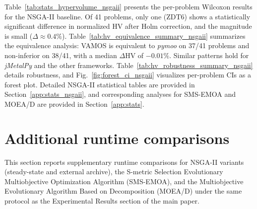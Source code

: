 \documentclass[journal]{IEEEtran}
\newcommand{\VAMOS}{VAMOS}
\begin{document}
Table~\ref{tab:stats_hypervolume_nsgaii} presents the per-problem Wilcoxon results for the NSGA-II baseline. Of 41 problems, only one (ZDT6) shows a statistically significant difference in normalized HV after Holm correction, and the magnitude is small ($\Delta \approx 0.4\%$). Table~\ref{tab:hv_equivalence_summary_nsgaii} summarizes the equivalence analysis: \VAMOS{} is equivalent to \textit{pymoo}  on 37/41 problems and non-inferior on 38/41, with a median $\Delta$HV of $-0.01\%$. Similar patterns hold for \textit{jMetalPy} and the other frameworks. Table~\ref{tab:hv_robustness_summary_nsgaii} details robustness, and Fig.~\ref{fig:forest_ci_nsgaii} visualizes per-problem CIs as a forest plot. Detailed NSGA-II statistical tables are provided in Section~\ref{app:stats_nsgaii}, and corresponding analyses for SMS-EMOA and MOEA/D are provided in Section~\ref{app:stats}.

\section{Additional runtime comparisons}
\label{app:variants}
This section reports supplementary runtime comparisons for NSGA-II variants (steady-state and external archive), the S-metric Selection Evolutionary Multiobjective Optimization Algorithm (SMS-EMOA), and the Multiobjective Evolutionary Algorithm Based on Decomposition (MOEA/D) under the same protocol as the Experimental Results section of the main paper.
\end{document}
